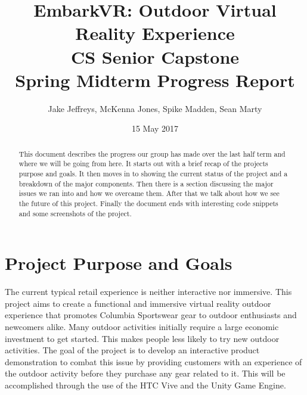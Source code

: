 \documentclass[10pt,journal,compsoc,onecolumn, draftclsnofoot]{IEEEtran}
\title{
EmbarkVR: Outdoor Virtual Reality Experience \\
CS Senior Capstone \\
Spring Midterm Progress Report\\
\vspace{1mm}
}
\author{Jake Jeffreys, McKenna Jones, Spike Madden, Sean Marty}
\date{15 May 2017}
\begin{document}
\begin{titlepage}
\maketitle
\vspace{1mm}
\begin{abstract}
This document describes the progress our group has made over the last half term and where we will be going from here. It starts out with a brief recap of the projects purpose and goals. It then moves in to showing the current status of the project and a breakdown of the major components. Then there is a section discussing the major issues we ran into and how we overcame them. After that we talk about how we see the future of this project. Finally the document ends with interesting code snippets and some screenshots of the project.
\end{abstract}
\vspace{1cm}


\end{titlepage}


\tableofcontents
\clearpage


\section{Project Purpose and Goals}
The current typical retail experience is neither interactive nor immersive.
This project aims to create a functional and immersive virtual reality outdoor experience that promotes Columbia Sportswear gear to outdoor enthusiasts and newcomers alike.
Many outdoor activities initially require a large economic investment to get started.
This makes people less likely to try new outdoor activities.
The goal of the project is to develop an interactive product demonstration to combat this issue by providing customers with an experience of the outdoor activity before they purchase any gear related to it.
This will be accomplished through the use of the HTC Vive and the Unity Game Engine.
\end{document}
